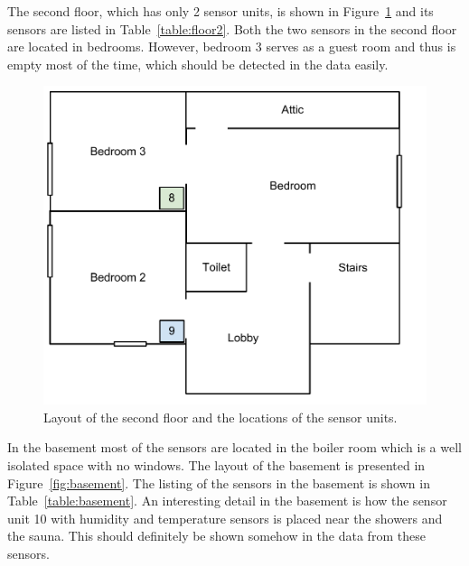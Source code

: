 The second floor, which has only 2 sensor units, is shown in Figure~\ref{fig:floor2} and its sensors are listed in Table~\ref{table:floor2}. Both the two sensors in the second floor are located in bedrooms. However, bedroom 3 serves as a guest room and thus is empty most of the time, which should be detected in the data easily.

\begin{figure}[here]
\centering
\includegraphics[scale=0.7]{images/ylakerta.pdf}
\caption{Layout of the second floor and the locations of the sensor units.}
\label{fig:floor2}
\end{figure}

In the basement most of the sensors are located in the boiler room which is a well isolated space with no windows. The layout of the basement is presented in Figure~\ref{fig:basement}. The listing of the sensors in the basement is shown in Table~\ref{table:basement}. An interesting detail in the basement is how the sensor unit 10 with humidity and temperature sensors is placed near the showers and the sauna. This should definitely be shown somehow in the data from these sensors.


